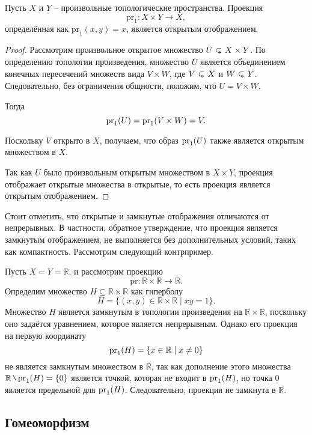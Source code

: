 \begin{statement}
	Пусть $X$ и $Y$ -- произвольные топологические пространства. Проекция 
	\[
	\mathrm{pr}_1 : X \times Y \to X,
	\]
	определённая как $\mathrm{pr}_1(x, y) = x$, является открытым отображением.	
\end{statement}
\begin{proof}
	Рассмотрим произвольное открытое множество $U \open X \times Y$. По определению топологии произведения, множество $U$ является объединением конечных пересечений множеств вида $V \times W$, где $V \open X$ и $W \open Y$. Следовательно, без ограничения общности, положим, что $U = V \times W$.

Тогда 
\[
\mathrm{pr}_{1}(U) = \mathrm{pr}_{1}(V \times W) = V.
\]

Поскольку $V$ открыто в $X$, получаем, что образ $\mathrm{pr}_{1}(U)$ также является открытым множеством в $X$. 

Так как $U$ было произвольным открытым множеством в $X \times Y$, проекция отображает открытые множества в открытые, то есть проекция является открытым отображением.
\end{proof}
Стоит отметить, что открытые и замкнутые отображения отличаются от непрерывных. В частности, обратное утверждение, что проекция является замкнутым отображением, не выполняется без дополнительных условий, таких как компактность. Рассмотрим следующий контрпример.
\begin{remark}
	Пусть $X = Y = \mathbb{R}$, и рассмотрим проекцию 
\[
\mathrm{pr} : \mathbb{R} \times \mathbb{R} \to \mathbb{R}.
\]
Определим множество $H \subseteq \mathbb{R} \times \mathbb{R}$ как гиперболу
\[
H = \{(x, y) \in \mathbb{R} \times \mathbb{R} \mid x y = 1\}.
\]
Множество $H$ является замкнутым в топологии произведения на $\mathbb{R} \times \mathbb{R}$, поскольку оно задаётся уравнением, которое является непрерывным. Однако его проекция на первую координату
\[
\mathrm{pr}_{1}(H) = \{x \in \mathbb{R} \mid x \neq 0\}
\]
не является замкнутым множеством в $\mathbb{R}$, так как дополнение этого множества $\mathbb{R} \setminus \pr{1}{H} = \{0\}$ является точкой, которая не входит в $\mathrm{pr}_{1}(H)$, но точка $0$ является предельной для $\mathrm{pr}_{1}(H)$. Следовательно, проекция не замкнута в $\mathbb{R}$.

\end{remark}


\subsection{Гомеоморфизм}


